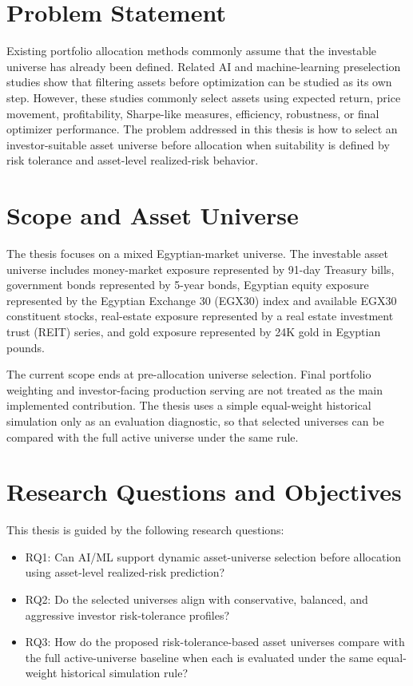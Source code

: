 \section{Problem Statement}

Existing portfolio allocation methods commonly assume that the investable universe has already been defined. Related AI and machine-learning preselection studies show that filtering assets before optimization can be studied as its own step. However, these studies commonly select assets using expected return, price movement, profitability, Sharpe-like measures, efficiency, robustness, or final optimizer performance. The problem addressed in this thesis is how to select an investor-suitable asset universe before allocation when suitability is defined by risk tolerance and asset-level realized-risk behavior.

\section{Scope and Asset Universe}

The thesis focuses on a mixed Egyptian-market universe. The investable asset universe includes money-market exposure represented by 91-day Treasury bills, government bonds represented by 5-year bonds, Egyptian equity exposure represented by the Egyptian Exchange 30 (EGX30) index and available EGX30 constituent stocks, real-estate exposure represented by a real estate investment trust (REIT) series, and gold exposure represented by 24K gold in Egyptian pounds.

The current scope ends at pre-allocation universe selection. Final portfolio weighting and investor-facing production serving are not treated as the main implemented contribution. The thesis uses a simple equal-weight historical simulation only as an evaluation diagnostic, so that selected universes can be compared with the full active universe under the same rule.

\section{Research Questions and Objectives}

This thesis is guided by the following research questions:

\begin{itemize}
    \item RQ1: Can AI/ML support dynamic asset-universe selection before allocation using asset-level realized-risk prediction?
    \item RQ2: Do the selected universes align with conservative, balanced, and aggressive investor risk-tolerance profiles?
    \item RQ3: How do the proposed risk-tolerance-based asset universes compare with the full active-universe baseline when each is evaluated under the same equal-weight historical simulation rule?
\end{itemize}

